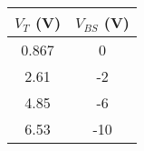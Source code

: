 \begin{tabular}{@{}cc@{}}
    \toprule
    \textbf{$V_{T}$ (V)} & \textbf{$V_{BS}$ (V)} \\ \midrule
    0.867 &         0           \\
    2.61  &        -2           \\
    4.85  &        -6          \\
    6.53  &        -10                   \\
 \bottomrule
\end{tabular}